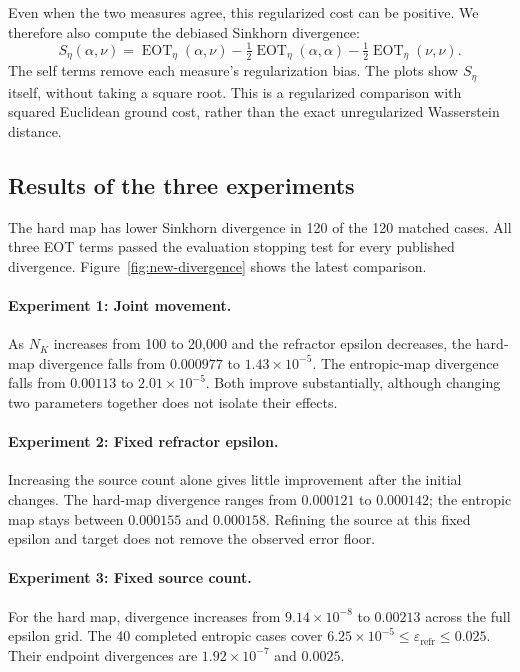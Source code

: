 Even when the two measures agree, this regularized cost can be positive.
We therefore also compute the debiased Sinkhorn divergence:
\begin{equation}
 \boxed{S_\eta(\alpha,\nu)=\operatorname{EOT}_\eta(\alpha,\nu)
 -\tfrac12\operatorname{EOT}_\eta(\alpha,\alpha)
 -\tfrac12\operatorname{EOT}_\eta(\nu,\nu).}
 \label{eq:new-divergence}
\end{equation}
The self terms remove each measure's regularization bias. The plots show
$S_\eta$ itself, without taking a square root. This is a regularized
comparison with squared Euclidean ground cost, rather than the exact
unregularized Wasserstein distance.

\subsection{Results of the three experiments}

The hard map has lower Sinkhorn divergence in 120 of the 120
matched cases. All three EOT terms passed the evaluation stopping test
for every published divergence. Figure~\ref{fig:new-divergence} shows
the latest comparison.

\paragraph{Experiment 1: Joint movement.}
As $N_K$ increases from 100 to 20,000 and the refractor epsilon
decreases, the hard-map divergence falls from
$0.000977$ to $1.43\times10^{-5}$. The entropic-map divergence
falls from $0.00113$ to $2.01\times10^{-5}$.
Both improve substantially, although changing two parameters together
does not isolate their effects.

\paragraph{Experiment 2: Fixed refractor epsilon.}
Increasing the source count alone gives little improvement after the
initial changes. The hard-map divergence ranges from
$0.000121$ to $0.000142$; the entropic map stays
between $0.000155$ and $0.000158$.
Refining the source at this fixed epsilon and target does not remove
the observed error floor.

\paragraph{Experiment 3: Fixed source count.}
For the hard map, divergence increases from
$9.14\times10^{-8}$ to $0.00213$ across the full epsilon grid.
The 40 completed entropic cases cover
$6.25\times10^{-5}\leq\varepsilon_{\mathrm{refr}}\leq 0.025$.
Their endpoint divergences are $1.92\times10^{-7}$ and $0.0025$.

